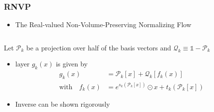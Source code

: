 \begin{frame}
    \frametitle{RNVP}
    \begin{itemize}
        \setlength\itemsep{.6em}
        \item The Real-valued Non-Volume-Preserving Normalizing Flow
    \end{itemize}
    \begin{columns}
        \begin{column}[t]{0.48\textwidth}
            \item Let $\mathcal{P}_k$ be a projection over half of the basis vectors and $\mathcal{Q}_k \equiv \mathbb{1} - \mathcal{P}_k$
            \begin{itemize}
                \item layer $g_k(x)$ is given by 
                \begin{equation}
                    \begin{split}
                        g_k(x) &= \mathcal{P}_k[x] + \mathcal{Q}_k [f_k(x)] \quad \\
                        \text{with} \quad f_k(x) &=  e^{s_k(\mathcal{P}_k[x])} \odot x + t_k(\mathcal{P}_k[x])
                    \end{split}
                    \label{eq:layer_RNVP}
                \end{equation}
                \setlength\itemsep{.6em}
                \item Inverse can be shown rigorously
            \end{itemize}
        \end{column}


\end{columns}
\end{frame}
